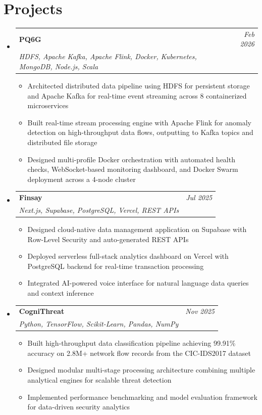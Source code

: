 \documentclass[a4paper,11pt]{article}
\makeatletter
\newcommand{\resumeItem}[1]{
  \item\small{#1 \vspace{-3pt}}
}
\newcommand{\resumeProject}[4]{
\vspace{0.5mm}\item[]
    \begin{tabular*}{0.98\textwidth}[t]{l@{\extracolsep{\fill}}r}
        \textbf{#1} & \textit{\footnotesize{#3}} \\
        \footnotesize{\textit{#2}} & \footnotesize{#4}
    \end{tabular*}
    \vspace{-2.4mm}
}
\newcommand{\resumeSubHeadingListStart}{\begin{itemize}[leftmargin=*,labelsep=0mm]}
\newcommand{\resumeItemListStart}{\begin{itemize}[leftmargin=3ex, rightmargin=2ex, labelsep=1.2mm, itemsep=1.2mm, topsep=1.5mm]\small}
\newcommand{\resumeSubHeadingListEnd}{\end{itemize}\vspace{2mm}}
\newcommand{\resumeItemListEnd}{\end{itemize}\vspace{-2mm}}
\makeatother
\begin{document}
\section{\textbf{Projects}}

\resumeSubHeadingListStart

\resumeProject{PQ6G}{HDFS, Apache Kafka, Apache Flink, Docker, Kubernetes, MongoDB, Node.js, Scala}{Feb 2026}{}
\resumeItemListStart
  \resumeItem{Architected distributed data pipeline using HDFS for persistent storage and Apache Kafka for real-time event streaming across 8 containerized microservices}
  \resumeItem{Built real-time stream processing engine with Apache Flink for anomaly detection on high-throughput data flows, outputting to Kafka topics and distributed file storage}
  \resumeItem{Designed multi-profile Docker orchestration with automated health checks, WebSocket-based monitoring dashboard, and Docker Swarm deployment across a 4-node cluster}
\resumeItemListEnd

\resumeProject{Finsay}{Next.js, Supabase, PostgreSQL, Vercel, REST APIs}{Jul 2025}{}
\resumeItemListStart
  \resumeItem{Designed cloud-native data management application on Supabase with Row-Level Security and auto-generated REST APIs}
  \resumeItem{Deployed serverless full-stack analytics dashboard on Vercel with PostgreSQL backend for real-time transaction processing}
  \resumeItem{Integrated AI-powered voice interface for natural language data queries and context inference}
\resumeItemListEnd

\resumeProject{CogniThreat}{Python, TensorFlow, Scikit-Learn, Pandas, NumPy}{Nov 2025}{}
\resumeItemListStart
  \resumeItem{Built high-throughput data classification pipeline achieving 99.91\% accuracy on 2.8M+ network flow records from the CIC-IDS2017 dataset}
  \resumeItem{Designed modular multi-stage processing architecture combining multiple analytical engines for scalable threat detection}
  \resumeItem{Implemented performance benchmarking and model evaluation framework for data-driven security analytics}
\resumeItemListEnd

\resumeSubHeadingListEnd
\vspace{-3mm}


\end{document}
